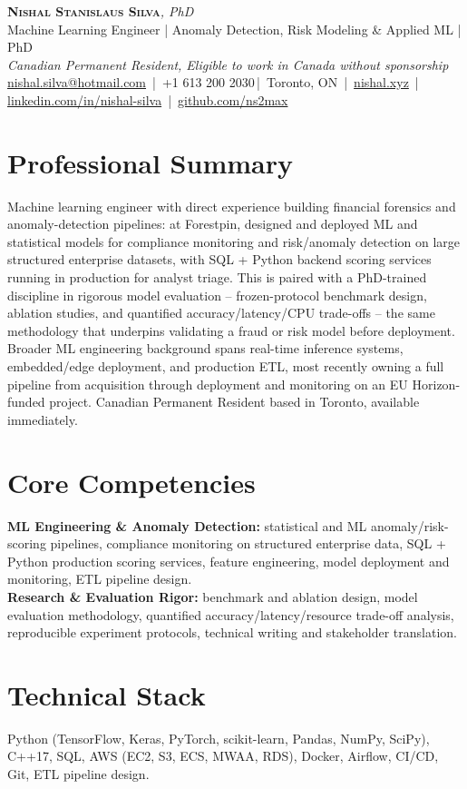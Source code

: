 \documentclass[11pt]{article}
\makeatletter
\newcommand{\cvName}{Nishal Stanislaus Silva}
\newcommand{\cvEmail}{nishal.silva@hotmail.com}
\newcommand{\cvPhone}{+1 613 200 2030}
\newcommand{\cvCity}{Toronto, ON}
\newcommand{\cvSite}{https://nishal.xyz}
\newcommand{\cvLinkedIn}{https://www.linkedin.com/in/nishal-silva}
\newcommand{\cvGitHub}{https://github.com/ns2max}
\newcommand{\cvStatus}{Canadian Permanent Resident, Eligible to work in Canada without sponsorship}
\newcommand{\cvTagline}{Machine Learning Engineer | Anomaly Detection, Risk Modeling \& Applied ML | PhD}
\makeatother
\begin{document}
\pagestyle{empty}
\begin{center}
    {\LARGE \scshape \textbf{\cvName}}{\large \textit{, PhD}}\\[1pt]
    {\small \cvTagline}\\[1pt]
    {\footnotesize\textit{\cvStatus}}\\[1pt]
    {\small
    \href{mailto:\cvEmail}{\cvEmail} \,|\, \cvPhone \,|\, \cvCity
    \,|\, \href{\cvSite}{nishal.xyz} \,|\, \href{\cvLinkedIn}{linkedin.com/in/nishal-silva}
    \,|\, \href{\cvGitHub}{github.com/ns2max}}
\end{center}

\section*{Professional Summary}
Machine learning engineer with direct experience building financial forensics and anomaly-detection pipelines: at Forestpin, designed and deployed ML and statistical models for compliance monitoring and risk/anomaly detection on large structured enterprise datasets, with SQL + Python backend scoring services running in production for analyst triage. This is paired with a PhD-trained discipline in rigorous model evaluation -- frozen-protocol benchmark design, ablation studies, and quantified accuracy/latency/CPU trade-offs -- the same methodology that underpins validating a fraud or risk model before deployment. Broader ML engineering background spans real-time inference systems, embedded/edge deployment, and production ETL, most recently owning a full pipeline from acquisition through deployment and monitoring on an EU Horizon-funded project. Canadian Permanent Resident based in Toronto, available immediately.

\section*{Core Competencies}
\textbf{ML Engineering \& Anomaly Detection:} statistical and ML anomaly/risk-scoring pipelines, compliance monitoring on structured enterprise data, SQL + Python production scoring services, feature engineering, model deployment and monitoring, ETL pipeline design. \\[2pt]
\textbf{Research \& Evaluation Rigor:} benchmark and ablation design, model evaluation methodology, quantified accuracy/latency/resource trade-off analysis, reproducible experiment protocols, technical writing and stakeholder translation.

\section*{Technical Stack}
Python (TensorFlow, Keras, PyTorch, scikit-learn, Pandas, NumPy, SciPy), C++17, SQL, AWS (EC2, S3, ECS, MWAA, RDS), Docker, Airflow, CI/CD, Git, ETL pipeline design.
\end{document}
